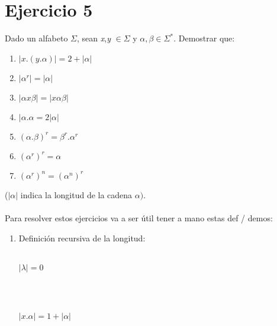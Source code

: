 \documentclass{article}
\begin{document}
{{\section*{Ejercicio 5}{Dado un alfabeto $\Sigma$, sean \textit{x},\textit{y} $\in \Sigma$ y $\alpha,\beta \in \Sigma^*$. Demostrar que:}
\begin{enumerate}[label=\alph*.,font=\itshape]
    \item $|x.(y.\alpha)| = 2 + |\alpha|$
    \item $|\alpha^r|=|\alpha|$
    \item $|\alpha x \beta| = |x \alpha \beta|$
    \item $|\alpha . \alpha = 2 |\alpha|$
    \item $(\alpha . \beta)^r = \beta^r . \alpha^r$
    \item $(\alpha^r)^r = \alpha$
    \item $(\alpha^r)^n = (\alpha^n)^r$
\end{enumerate}

{($|\alpha|$ indica la longitud de la cadena $\alpha)$.}
\\
\\
{Para resolver estos ejercicios va a ser útil tener a mano estas def / demos:}

\renewcommand\labelenumi{(\theenumi)}
\begin{enumerate}
    \item {Definición recursiva de la longitud:}
    \\
    \\
    \centerline{{$|\lambda| = 0$}}
    \\
    \\
    \centerline{{$|x.\alpha| = 1 + |\alpha|$}}


\end{enumerate}}}
\end{document}
